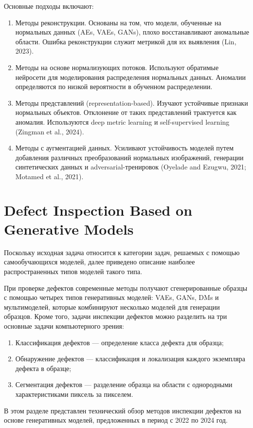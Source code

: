 \documentclass[14pt,a4paper]{article}
\begin{document}
Основные подходы включают:
\begin{enumerate}
	\item Методы реконструкции. Основаны на том, что модели, обученные на нормальных данных (AEs, VAEs, GANs), плохо восстанавливают аномальные области. Ошибка реконструкции служит метрикой для их выявления (Lin, 2023).
	\item Методы на основе нормализующих потоков. Используют обратимые нейросети для моделирования распределения нормальных данных. Аномалии определяются по низкой вероятности в обученном распределении.
	\item Методы представлений (representation-based). Изучают устойчивые признаки нормальных объектов. Отклонение от таких представлений трактуется как аномалия. Используются deep metric learning и self-supervised learning (Zingman et al., 2024).
	\item  Методы с аугментацией данных. Усиливают устойчивость моделей путем добавления различных преобразований нормальных изображений, генерации синтетических данных и adversarial-тренировок (Oyelade and Ezugwu, 2021; Motamed et al., 2021).
\end{enumerate}

\section{Defect Inspection Based on Generative Models}
Поскольку исходная задача относится к категории задач, решаемых с помощью самообучающихся моделей, далее приведено описание наиболее распространенных типов моделей такого типа.

При проверке дефектов современные методы получают сгенерированные образцы с помощью четырех типов генеративных моделей: VAEs, GANs, DMs и мультимоделей, которые комбинируют несколько моделей для генерации образцов. Кроме того, задачи инспекции дефектов можно разделить на три основные задачи компьютерного зрения:  
\begin{enumerate}
	\item Классификация дефектов — определение класса дефекта для образца;
	\item Обнаружение дефектов — классификация и локализация каждого экземпляра дефекта в образце;
	\item Сегментация дефектов — разделение образца на области с однородными характеристиками пиксель за пикселем.
\end{enumerate}

В этом разделе представлен технический обзор методов инспекции дефектов на основе генеративных моделей, предложенных в период с 2022 по 2024 год.\cite{YuHe2024}
\end{document}
